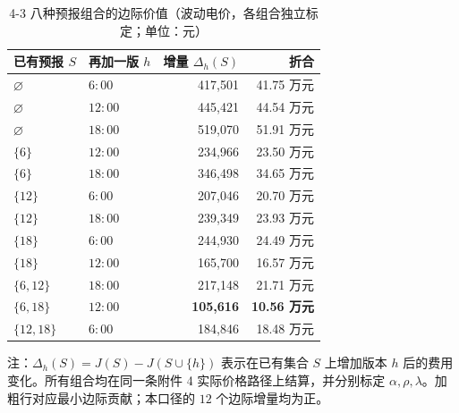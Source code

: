 
\begin{table}[htbp]
  \centering
  \caption{4-3 八种预报组合的边际价值（波动电价，各组合独立标定；单位：元）}
  \label{tab:p4-combo-detail}
  \small
  \begin{tabular}{llrr}
    \toprule
    已有预报 $S$ & 再加一版 $h$ & 增量 $\Delta_h(S)$ & 折合 \\
    \midrule
    $\varnothing$ & $6{:}00$ & 417,501 & 41.75 万元 \\
    $\varnothing$ & $12{:}00$ & 445,421 & 44.54 万元 \\
    $\varnothing$ & $18{:}00$ & 519,070 & 51.91 万元 \\
    \midrule
    $\{6\}$ & $12{:}00$ & 234,966 & 23.50 万元 \\
    $\{6\}$ & $18{:}00$ & 346,498 & 34.65 万元 \\
    $\{12\}$ & $6{:}00$ & 207,046 & 20.70 万元 \\
    $\{12\}$ & $18{:}00$ & 239,349 & 23.93 万元 \\
    $\{18\}$ & $6{:}00$ & 244,930 & 24.49 万元 \\
    $\{18\}$ & $12{:}00$ & 165,700 & 16.57 万元 \\
    \midrule
    $\{6,12\}$ & $18{:}00$ & 217,148 & 21.71 万元 \\
    $\{6,18\}$ & $12{:}00$ & \textbf{105,616} & \textbf{10.56 万元} \\
    $\{12,18\}$ & $6{:}00$ & 184,846 & 18.48 万元 \\
    \bottomrule
  \end{tabular}
  \par\vspace{2pt}
  \begin{minipage}{\textwidth}\footnotesize
    注：$\Delta_h(S)=J(S)-J(S\cup\{h\})$ 表示在已有集合 $S$ 上增加版本 $h$ 后的费用变化。所有组合均在同一条附件 4 实际价格路径上结算，并分别标定 $\alpha,\rho,\lambda$。加粗行对应最小边际贡献；本口径的 $12$ 个边际增量均为正。
  \end{minipage}
\end{table}
